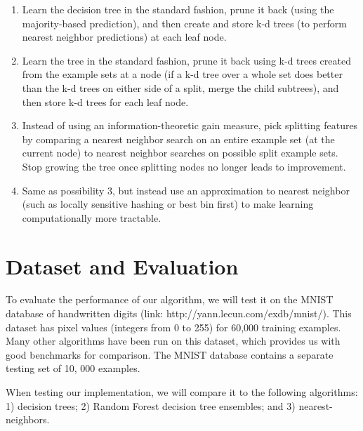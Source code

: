 \documentclass[10pt]{article}
\begin{document}
\begin{enumerate}
	\item Learn the decision tree in the standard fashion, prune it back (using the majority-based prediction), and then create and store k-d trees (to perform nearest neighbor predictions) at each leaf node.
	\item Learn the tree in the standard fashion, prune it back using k-d trees created from the example sets at a node (if a k-d tree over a whole set does better than the k-d trees on either side of a split, merge the child subtrees), and then store k-d trees for each leaf node. 
	\item Instead of using an information-theoretic gain measure, pick splitting features by comparing a nearest neighbor search on an entire example set (at the current node) to nearest neighbor searches on possible split example sets.  Stop growing the tree once splitting nodes no longer leads to improvement.
	\item Same as possibility 3, but instead use an approximation to nearest neighbor (such as locally sensitive hashing or best bin first) to make learning computationally more tractable.

\end{enumerate}

\section{Dataset and Evaluation}
To evaluate the performance of our algorithm, we will test it on the MNIST database of handwritten digits (link: http://yann.lecun.com/exdb/mnist/). This dataset has pixel values (integers from 0 to 255) for 60,000 training examples. Many other algorithms have been run on this dataset, which provides us with good benchmarks for comparison. The MNIST database contains a separate testing set of 10, 000 examples.

When testing our implementation, we will compare it to the following algorithms:  1) decision trees; 2) Random Forest decision tree ensembles; and 3) nearest-neighbors.
	
\end{document}
